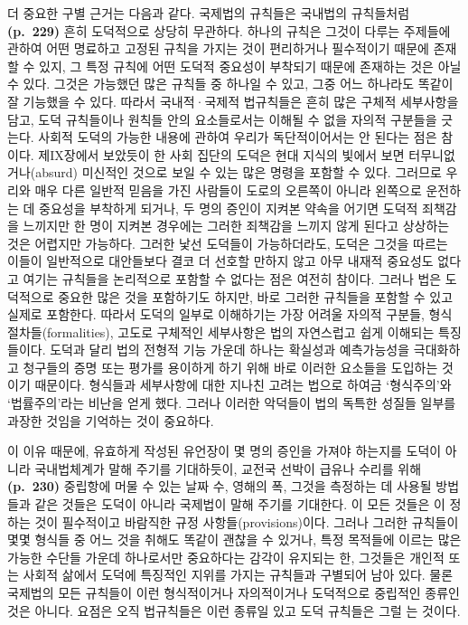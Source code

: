 더 중요한 구별 근거는 다음과 같다. 국제법의 규칙들은 국내법의 규칙들처럼
\textbf{(p.~229)} 흔히 도덕적으로 상당히 무관하다. 하나의 규칙은 그것이
다루는 주제들에 관하여 어떤 명료하고 고정된 규칙을 가지는 것이
편리하거나 필수적이기 때문에 존재할 수 있지, 그 특정 규칙에 어떤 도덕적
중요성이 부착되기 때문에 존재하는 것은 아닐 수 있다. 그것은 가능했던
많은 규칙들 중 하나일 수 있고, 그중 어느 하나라도 똑같이 잘 기능했을 수
있다. 따라서 국내적·국제적 법규칙들은 흔히 많은 구체적 세부사항을 담고,
도덕 규칙들이나 원칙들 안의 요소들로서는 이해될 수 없을 자의적 구분들을
긋는다. 사회적 도덕의 가능한 내용에 관하여 우리가 독단적이어서는 안
된다는 점은 참이다. 제IX장에서 보았듯이 한 사회 집단의 도덕은 현대
지식의 빛에서 보면 터무니없거나(absurd) 미신적인 것으로 보일 수 있는
많은 명령을 포함할 수 있다. 그러므로 우리와 매우 다른 일반적 믿음을 가진
사람들이 도로의 오른쪽이 아니라 왼쪽으로 운전하는 데 
중요성을 부착하게 되거나, 두 명의 증인이 지켜본 약속을 어기면 도덕적
죄책감을 느끼지만 한 명이 지켜본 경우에는 그러한 죄책감을 느끼지 않게
된다고 상상하는 것은 어렵지만 가능하다. 그러한 낯선 도덕들이
가능하더라도, 도덕은 그것을 따르는 이들이 일반적으로 대안들보다 결코 더
선호할 만하지 않고 아무 내재적 중요성도 없다고 여기는 규칙들을
논리적으로 포함할 수 없다는 점은 여전히 참이다. 그러나 법은 도덕적으로
중요한 많은 것을 포함하기도 하지만, 바로 그러한 규칙들을 포함할 수 있고
실제로 포함한다. 따라서 도덕의 일부로 이해하기는 가장 어려울 자의적
구분들, 형식절차들(formalities), 고도로 구체적인 세부사항은 법의
자연스럽고 쉽게 이해되는 특징들이다. 도덕과 달리 법의 전형적 기능 가운데
하나는 확실성과 예측가능성을 극대화하고 청구들의 증명 또는 평가를
용이하게 하기 위해 바로 이러한 요소들을 도입하는 것이기 때문이다.
형식들과 세부사항에 대한 지나친 고려는 법으로 하여금 ‘형식주의’와
‘법률주의’라는 비난을 얻게 했다. 그러나 이러한 악덕들이 법의 독특한
성질들 일부를 과장한 것임을 기억하는 것이 중요하다.

이 이유 때문에, 유효하게 작성된 유언장이 몇 명의 증인을 가져야 하는지를
도덕이 아니라 국내법체계가 말해 주기를 기대하듯이, 교전국 선박이 급유나
수리를 위해 \textbf{(p.~230)} 중립항에 머물 수 있는 날짜 수, 영해의 폭,
그것을 측정하는 데 사용될 방법들과 같은 것들은 도덕이 아니라 국제법이
말해 주기를 기대한다. 이 모든 것들은 이 정하는 것이
필수적이고 바람직한 규정 사항들(provisions)이다. 그러나 그러한 규칙들이
몇몇 형식들 중 어느 것을 취해도 똑같이 괜찮을 수 있거나, 특정 목적들에
이르는 많은 가능한 수단들 가운데 하나로서만 중요하다는 감각이 유지되는
한, 그것들은 개인적 또는 사회적 삶에서 도덕에 특징적인 지위를 가지는
규칙들과 구별되어 남아 있다. 물론 국제법의 모든 규칙들이 이런
형식적이거나 자의적이거나 도덕적으로 중립적인 종류인 것은 아니다. 요점은
오직 법규칙들은 이런 종류일  있고 도덕 규칙들은 그럴 는 것이다.

